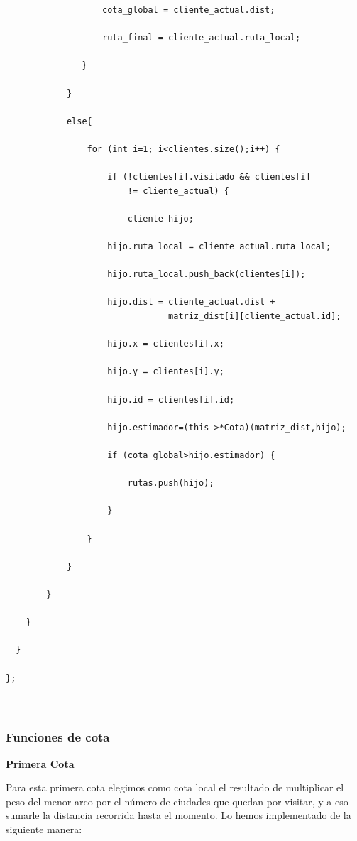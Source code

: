 \documentclass[a4paper,12pt,twoside]{article} %
\begin{document}
\begin{lstlisting}
                   cota_global = cliente_actual.dist;

                   ruta_final = cliente_actual.ruta_local;

               }

            }

            else{

                for (int i=1; i<clientes.size();i++) {

                    if (!clientes[i].visitado && clientes[i] 
                        != cliente_actual) {

                        cliente hijo;

                    hijo.ruta_local = cliente_actual.ruta_local;

                    hijo.ruta_local.push_back(clientes[i]);

                    hijo.dist = cliente_actual.dist +
                                matriz_dist[i][cliente_actual.id];

                    hijo.x = clientes[i].x;

                    hijo.y = clientes[i].y;

                    hijo.id = clientes[i].id;

                    hijo.estimador=(this->*Cota)(matriz_dist,hijo);

                    if (cota_global>hijo.estimador) {

                        rutas.push(hijo);

                    }

                }

            }

        }

    }

  }

};



\end{lstlisting}

\vspace{1cm}

\newpage

\subsubsection{Funciones de cota}

\textbf{Primera Cota}

 Para esta primera cota elegimos como cota local el resultado de multiplicar el peso del menor arco por el número de ciudades que quedan por visitar, y a eso sumarle la distancia recorrida hasta el momento. Lo hemos implementado de la siguiente manera:
\end{document}
